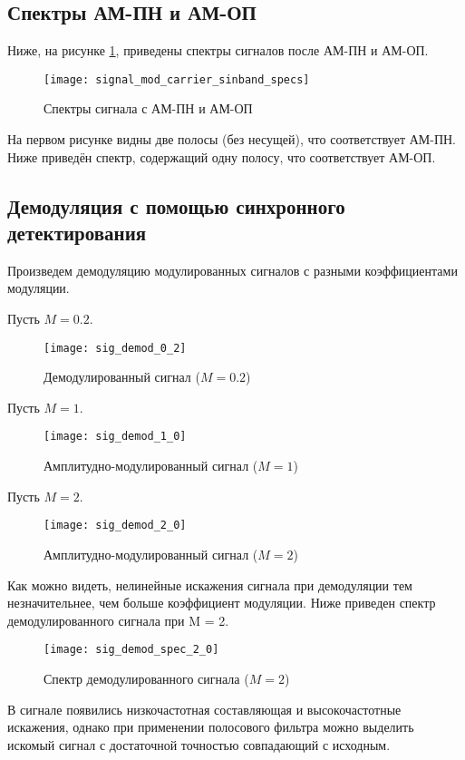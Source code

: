 \subsection{Спектры АМ-ПН и АМ-ОП}
Ниже, на рисунке \ref{pic:signal_mod_carrier_sinband_specs}, приведены спектры сигналов после АМ-ПН и АМ-ОП.
\begin{figure}[H]
	\begin{center}
		\texttt{[image: signal\_mod\_carrier\_sinband\_specs]}
		\caption{Спектры сигнала с АМ-ПН и АМ-ОП} 
		\label{pic:signal_mod_carrier_sinband_specs} %
	\end{center}
\end{figure}
На первом рисунке видны две полосы (без несущей), что соответствует АМ-ПН. Ниже приведён спектр, содержащий одну полосу, что соответствует АМ-ОП.

\subsection{Демодуляция с помощью синхронного детектирования}
Произведем демодуляцию модулированных сигналов с разными коэффициентами модуляции.

Пусть $M = 0.2$.
\begin{figure}[H]
	\begin{center}
		\texttt{[image: sig\_demod\_0\_2]}
		\caption{Демодулированный сигнал ($M = 0.2$)} 
		\label{pic:sig_demod_0_2} %
	\end{center}
\end{figure}

Пусть $M = 1$.
\begin{figure}[H]
	\begin{center}
		\texttt{[image: sig\_demod\_1\_0]}
		\caption{Амплитудно-модулированный сигнал ($M = 1$)} 
		\label{pic:sig_demod_1_0} %
	\end{center}
\end{figure}

Пусть $M = 2$.
\begin{figure}[H]
	\begin{center}
		\texttt{[image: sig\_demod\_2\_0]}
		\caption{Амплитудно-модулированный сигнал ($M = 2$)} 
		\label{pic:sig_demod_2_0} %
	\end{center}
\end{figure}

Как можно видеть, нелинейные искажения сигнала при демодуляции тем незначительнее, чем больше коэффициент модуляции.
Ниже приведен спектр демодулированного сигнала при M = 2.
\begin{figure}[H]
	\begin{center}
		\texttt{[image: sig\_demod\_spec\_2\_0]}
		\caption{Спектр демодулированного сигнала ($M = 2$)} 
		\label{pic:sig_demod_spec_2_0} %
	\end{center}
\end{figure}
В сигнале появились низкочастотная составляющая и высокочастотные искажения, однако при применении полосового фильтра можно выделить искомый сигнал с достаточной точностью совпадающий с исходным.

